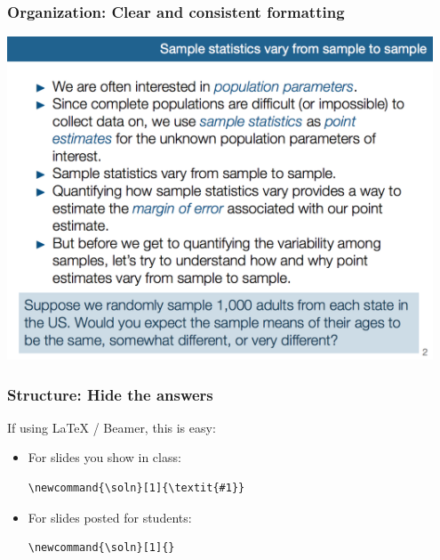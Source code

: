 \documentclass{beamer}
\begin{document}
\begin{frame}
\frametitle{Organization: Clear and consistent formatting}

\begin{center}
\includegraphics[width = 0.95\textwidth]{figures/disc_question}
\end{center}

\vfill

\end{frame}


\begin{frame}[fragile]
\frametitle{Structure: Hide the answers}

If using LaTeX / Beamer, this is easy:

\begin{itemize}

\item For slides you show in class:

\begin{verbatim}
\newcommand{\soln}[1]{\textit{#1}}
\end{verbatim}

\item For slides posted for students:

\begin{verbatim}
\newcommand{\soln}[1]{}
\end{verbatim}

\end{itemize}

\end{frame}
\end{document}
